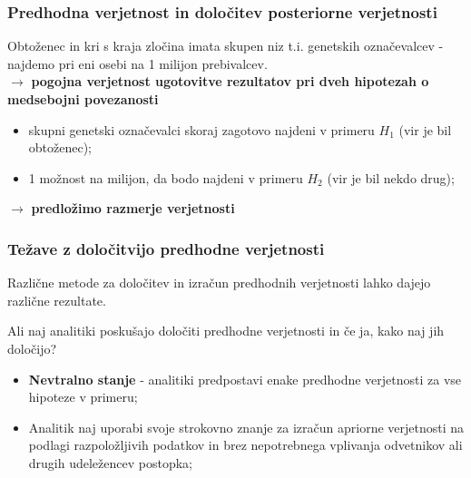\documentclass{beamer}
\begin{document}
\begin{frame}
    \frametitle{Predhodna verjetnost in določitev posteriorne verjetnosti}
    Obtoženec in kri s kraja zločina imata skupen niz t.i. genetskih označevalcev - najdemo pri eni osebi na 1 milijon prebivalcev.\\ \vspace{3mm}
    \centering
    $\rightarrow$ \textbf{pogojna verjetnost ugotovitve rezultatov pri dveh hipotezah o medsebojni povezanosti}
    \begin{itemize}
        \item skupni genetski označevalci skoraj zagotovo najdeni v primeru $H_1$ (vir je bil obtoženec);
        \item 1 možnost na milijon, da bodo najdeni v primeru $H_2$ (vir je bil nekdo drug);
    \end{itemize}
    \centering 
    $\rightarrow$ \textbf{predložimo razmerje verjetnosti}
\end{frame}

\begin{frame}
    \frametitle{Težave z določitvijo predhodne verjetnosti}
    Različne metode za določitev in izračun predhodnih verjetnosti lahko dajejo različne rezultate. \\ \vspace{3mm}
    \begin{block}{Ali naj analitiki poskušajo določiti predhodne verjetnosti in če ja, kako naj jih določijo?}
        \begin{itemize}
            \item \textbf{Nevtralno stanje} - analitiki predpostavi enake predhodne verjetnosti za vse hipoteze v primeru;
            \item Analitik naj uporabi svoje strokovno znanje za izračun apriorne verjetnosti na podlagi razpoložljivih podatkov in brez nepotrebnega vplivanja odvetnikov ali drugih udeležencev postopka;
        \end{itemize}
    \end{block}
\end{frame}

\end{document}

